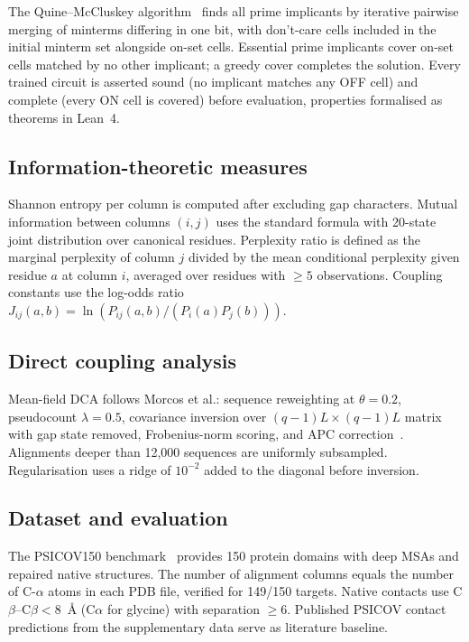 The Quine--McCluskey algorithm~\cite{quine1952,mccluskey1956} finds all prime
implicants by iterative pairwise merging of minterms differing in one bit,
with don't-care cells included in the initial minterm set alongside on-set
cells.  Essential prime implicants cover on-set cells matched by no other
implicant; a greedy cover completes the solution.  Every trained circuit is
asserted sound (no implicant matches any OFF cell) and complete (every ON cell
is covered) before evaluation, properties formalised as theorems in Lean~4.

\subsection{Information-theoretic measures}

Shannon entropy per column is computed after excluding gap characters.
Mutual information between columns $(i,j)$ uses the standard formula with
20-state joint distribution over canonical residues.  Perplexity ratio is
defined as the marginal perplexity of column $j$ divided by the mean
conditional perplexity given residue $a$ at column $i$, averaged over residues
with $\geq 5$ observations.  Coupling constants use the log-odds ratio
$J_{ij}(a,b) = \ln(P_{ij}(a,b)/(P_i(a)P_j(b)))$.

\subsection{Direct coupling analysis}

Mean-field DCA follows Morcos et al.\cite{morcos2011}: sequence reweighting at
$\theta = 0.2$, pseudocount $\lambda = 0.5$, covariance inversion over
$(q{-}1)L \times (q{-}1)L$ matrix with gap state removed, Frobenius-norm
scoring, and APC correction~\cite{dunn2008}.  Alignments deeper than 12{,}000
sequences are uniformly subsampled.  Regularisation uses a ridge of
$10^{-2}$ added to the diagonal before inversion.

\subsection{Dataset and evaluation}

The PSICOV150 benchmark~\cite{jones2012} provides 150 protein domains with
deep MSAs and repaired native structures.  The number of alignment columns
equals the number of C-$\alpha$ atoms in each PDB file, verified for 149/150
targets.  Native contacts use C$\beta$--C$\beta < 8$~\AA{} (C$\alpha$ for
glycine) with separation $\geq 6$.  Published PSICOV contact predictions from
the supplementary data serve as literature baseline.

